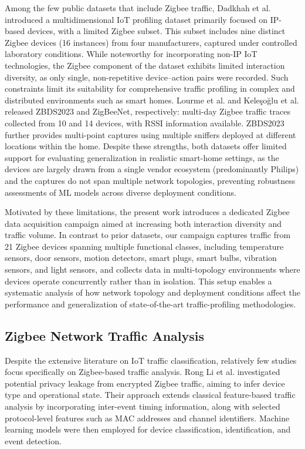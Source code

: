 Among the few public datasets that include Zigbee traffic, Dadkhah et al. \cite{iot_dataset_paper} introduced a multidimensional IoT profiling dataset primarily focused on IP-based devices, with a limited Zigbee subset. This subset includes nine distinct Zigbee devices (16 instances) from four manufacturers, captured under controlled laboratory conditions. While noteworthy for incorporating non-IP IoT technologies, the Zigbee component of the dataset exhibits limited interaction diversity, as only single, non-repetitive device–action pairs were recorded. Such constraints limit its suitability for comprehensive traffic profiling in complex and distributed environments such as smart homes.
Lourme et al. \cite{NDW74U_2023} and Keleşoğlu et al. \cite{app142310844} released ZBDS2023 and ZigBeeNet, respectively: multi-day Zigbee traffic traces collected from 10 and 14 devices, with RSSI information available. ZBDS2023 further provides multi-point captures using multiple sniffers deployed at different locations within the home. Despite these strengths, both datasets offer limited support for evaluating generalization in realistic smart-home settings, as the devices are largely drawn from a single vendor ecosystem (predominantly Philips) and the captures do not span multiple network topologies, preventing robustness assessments of ML models across diverse deployment conditions.


Motivated by these limitations, the present work introduces a dedicated Zigbee data acquisition campaign aimed at increasing both interaction diversity and traffic volume. In contrast to prior datasets, our campaign captures traffic from 21 Zigbee devices spanning multiple functional classes, including temperature sensors, door sensors, motion detectors, smart plugs, smart bulbs, vibration sensors, and light sensors, and collects data in multi-topology environments where devices operate concurrently rather than in isolation. This setup enables a systematic analysis of how network topology and deployment conditions affect the performance and generalization of state-of-the-art traffic-profiling methodologies.


\subsection{Zigbee Network Traffic Analysis}
Despite the extensive literature on IoT traffic classification, relatively few studies focus specifically on Zigbee-based traffic analysis. Rong Li et al. \cite{ZPA2023} investigated potential privacy leakage from encrypted Zigbee traffic, aiming to infer device type and operational state. Their approach extends classical feature-based traffic analysis by incorporating inter-event timing information, along with selected protocol-level features such as MAC addresses and channel identifiers. Machine learning models were then employed for device classification, identification, and event detection.

